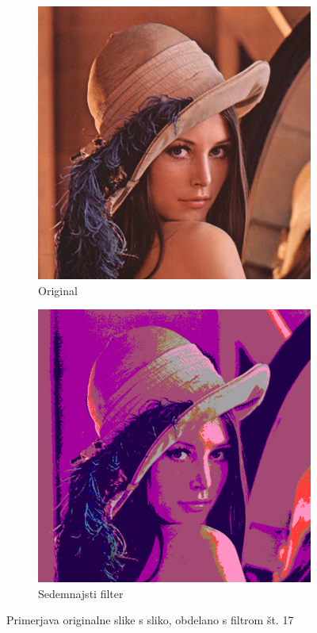 \documentclass[a4paper, 12pt]{book}
\begin{document}
\begin{figure}[!ht]
    \centering
    \begin{subfigure}[b]{0.4\textwidth}
        \includegraphics[width=\textwidth]{lena}
        \caption{Original}
    \end{subfigure}
    \begin{subfigure}[b]{0.4\textwidth}
        \includegraphics[width=\textwidth]{lena_filter_17}
        \caption{Sedemnajsti filter}
    \end{subfigure}
    \caption{Primerjava originalne slike s sliko, obdelano s filtrom št. 17}
    \label{fig:lena_filter_17}
\end{figure}
\end{document}
